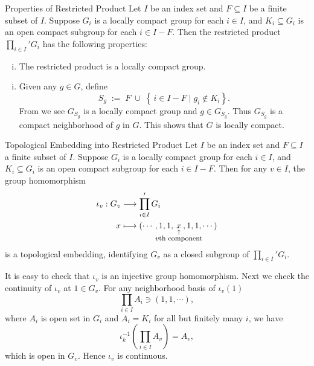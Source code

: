 \documentclass{report}
\begin{document}
\begin{proposition}{Properties of Restricted Product}{}
	Let \( I \) be an index set and \( F\subseteq I \) be a finite subset of \( I \). Suppose \( G_i \) is a locally compact group for each \( i \in I \), and \( K_i \subseteq G_i \) is an open compact subgroup for each \( i \in I - F \). Then the restricted product \( \prod_{i\in I}' G_i \) has the following properties:
	\begin{enumerate}[(i)]
		\item The restricted product is a locally compact group.
	\end{enumerate}
\end{proposition}
\begin{prf}
	\begin{enumerate}[(i)]
		\item Given any $g\in G$, define 
	\[
	S_g\;:=\;F\;\cup\;\left\{\,i\in I- F \mid g_i\notin K_i\right\}.
	\]
	From  we see $G_{S_g}$ is a locally compact group and $g\in G_{S_g}$. Thus  $G_{S_g}$ is a compact neighborhood of $g$ in $G$. This shows that $G$ is locally compact.
	\end{enumerate}
\end{prf}

\begin{example}{Topological Embedding into Restricted Product}{}
	Let \( I \) be an index set and \( F\subseteq I \) a finite subset of \( I \). Suppose \( G_i \) is a locally compact group for each \( i \in I \), and \( K_i \subseteq G_i \) is an open compact subgroup for each \( i \in I - F \). Then for any $v\in I$, the group homomorphism
	\begin{align*}
		\iota_v:G_v &\longrightarrow \prod_{i\in I}' G_i \\
		x &\longmapsto (\cdots, 1, 1, \underset{\hspace{-2.3em} \substack{\uparrow \\ \text{\footnotesize $v$th component}}\hspace{-2.3em}}{x},
		1, 1,  \cdots)
	\end{align*}
	is a topological embedding, identifying $G_v$ as a closed subgroup of $\prod_{i\in I}' G_i$.
\end{example}
\begin{prf}
	It is easy to check that $\iota_v$ is an injective group homomorphism. Next we check the continuity of $\iota_v$ at $1\in G_v$. For any neighborhood basis of $\iota_v(1)$
	\[
		\prod_{i\in I} A_i\ni (1,1,\cdots),
	\]
	where $A_i$ is open set in $G_i$ and $A_i=K_i$ for all but finitely many $i$, we have
	\[
		\iota_k^{-1}\left(\prod_{i\in I} A_v\right)=A_v,
	\]
	which is open in $G_v$. Hence $\iota_v$ is continuous. 
\end{prf}
\end{document}
